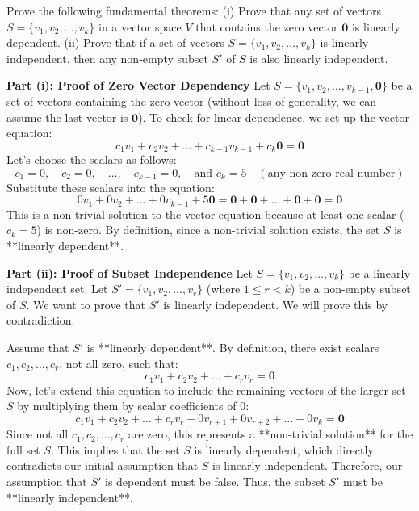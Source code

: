 \documentclass[11pt,a4paper]{article}
\begin{document}
\vspace{0.8cm}

\begin{questionbox}
Prove the following fundamental theorems:
(i) Prove that any set of vectors $S = \{v_1, v_2, \dots, v_k\}$ in a vector space $V$ that contains the zero vector $\mathbf{0}$ is linearly dependent.
(ii) Prove that if a set of vectors $S = \{v_1, v_2, \dots, v_k\}$ is linearly independent, then any non-empty subset $S'$ of $S$ is also linearly independent.
\end{questionbox}

\begin{solutionbox}
\textbf{Part (i): Proof of Zero Vector Dependency}
Let $S = \{v_1, v_2, \dots, v_{k-1}, \mathbf{0}\}$ be a set of vectors containing the zero vector (without loss of generality, we can assume the last vector is $\mathbf{0}$).
To check for linear dependence, we set up the vector equation:
\[ c_1 v_1 + c_2 v_2 + \dots + c_{k-1} v_{k-1} + c_k \mathbf{0} = \mathbf{0} \]
Let's choose the scalars as follows:
\[ c_1 = 0, \quad c_2 = 0, \quad \dots, \quad c_{k-1} = 0, \quad \text{and } c_k = 5 \quad (\text{any non-zero real number}) \]
Substitute these scalars into the equation:
\[ 0 v_1 + 0 v_2 + \dots + 0 v_{k-1} + 5 \mathbf{0} = \mathbf{0} + \mathbf{0} + \dots + \mathbf{0} + \mathbf{0} = \mathbf{0} \]
This is a non-trivial solution to the vector equation because at least one scalar ($c_k = 5$) is non-zero.
By definition, since a non-trivial solution exists, the set $S$ is **linearly dependent**.

\textbf{Part (ii): Proof of Subset Independence}
Let $S = \{v_1, v_2, \dots, v_k\}$ be a linearly independent set. 
Let $S' = \{v_1, v_2, \dots, v_r\}$ (where $1 \le r < k$) be a non-empty subset of $S$.
We want to prove that $S'$ is linearly independent. We will prove this by contradiction.

Assume that $S'$ is **linearly dependent**.
By definition, there exist scalars $c_1, c_2, \dots, c_r$, not all zero, such that:
\[ c_1 v_1 + c_2 v_2 + \dots + c_r v_r = \mathbf{0} \]
Now, let's extend this equation to include the remaining vectors of the larger set $S$ by multiplying them by scalar coefficients of $0$:
\[ c_1 v_1 + c_2 v_2 + \dots + c_r v_r + 0 v_{r+1} + 0 v_{r+2} + \dots + 0 v_k = \mathbf{0} \]
Since not all $c_1, c_2, \dots, c_r$ are zero, this represents a **non-trivial solution** for the full set $S$.
This implies that the set $S$ is linearly dependent, which directly contradicts our initial assumption that $S$ is linearly independent.
Therefore, our assumption that $S'$ is dependent must be false.
Thus, the subset $S'$ must be **linearly independent**.
\end{solutionbox}
\end{document}
